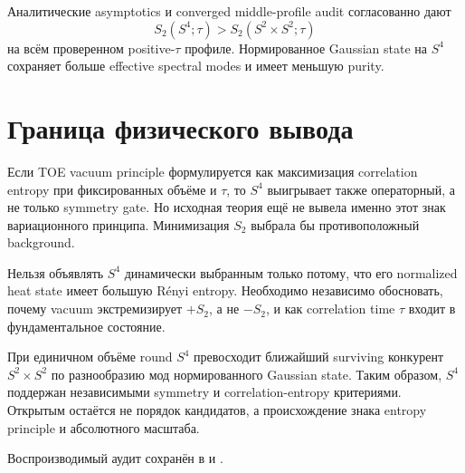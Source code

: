 \begin{proposition}
Аналитические asymptotics и converged middle-profile audit согласованно дают
\begin{equation}
 S_2(S^4;\tau)>S_2(S^2\times S^2;\tau)
\end{equation}
на всём проверенном positive-\(\tau\) профиле. Нормированное Gaussian state
на \(S^4\) сохраняет больше effective spectral modes и имеет меньшую purity.
\end{proposition}

\section{Граница физического вывода}

Если TOE vacuum principle формулируется как максимизация correlation
entropy при фиксированных объёме и \(\tau\), то \(S^4\) выигрывает также
операторный, а не только symmetry gate. Но исходная теория ещё не вывела
именно этот знак вариационного принципа. Минимизация \(S_2\) выбрала бы
противоположный background.

\begin{nogocriterion}
Нельзя объявлять \(S^4\) динамически выбранным только потому, что его
normalized heat state имеет большую Rényi entropy. Необходимо независимо
обосновать, почему vacuum экстремизирует \(+S_2\), а не \(-S_2\), и как
correlation time \(\tau\) входит в фундаментальное состояние.
\end{nogocriterion}

\begin{theorem}
При единичном объёме round \(S^4\) превосходит ближайший surviving конкурент
\(S^2\times S^2\) по разнообразию мод нормированного Gaussian state. Таким
образом, \(S^4\) поддержан независимыми symmetry и correlation-entropy
критериями. Открытым остаётся не порядок кандидатов, а происхождение знака
entropy principle и абсолютного масштаба.
\end{theorem}

Воспроизводимый аудит сохранён в
 и
.